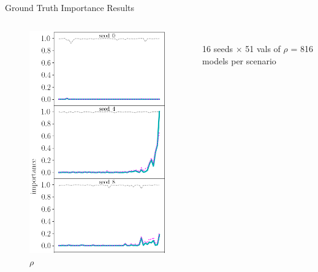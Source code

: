 \documentclass[German, aspectratio=169]{beamer}
\begin{document}
\begin{frame}[t]{Ground Truth Importance Results}
    \begin{columns}
        \begin{column}[t]{0.3\textwidth}
            \vspace{-0.8cm}
            \begin{figure}[t]
                \centering
                \includegraphics[width=\textwidth]{images/compare_seeds_mac_1.png}\\
                \vspace{-.3cm}
                $\rho$
            \end{figure}
        \end{column}
        \begin{column}[t]{0.38\textwidth}
            \centering
            \vspace{1cm} \\
            16 seeds $\times$ 51 vals of $\rho$ = 816 models per scenario


\end{column}
\end{columns}
\end{frame}
\end{document}
